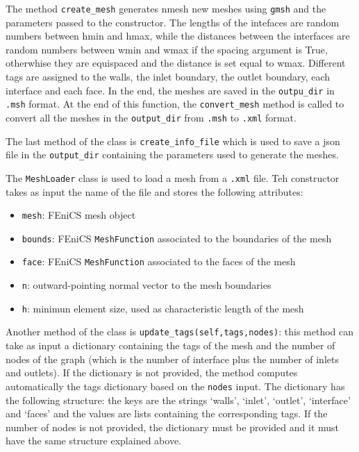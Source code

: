 \documentclass[11pt,a4paper]{article}
\begin{document}
The method \texttt{create\_mesh} generates nmesh new meshes using \texttt{gmsh} and the parameters passed to the constructor. The lengths of the intefaces are random numbers between hmin and hmax, while the distances between the interfaces are random numbers between wmin and wmax if the spacing argument is True, otherwhise they are equispaced and the distance is set equal to wmax. Different tags are assigned to the walls, the inlet boundary, the outlet boundary, each interface and each face. In the end, the meshes are saved in the \texttt{outpu\_dir} in \texttt{.msh} format.
At the end of this function, the \texttt{convert\_mesh} method is called to convert all the meshes in the \texttt{output\_dir} from \texttt{.msh} to \texttt{.xml} format. 

The last method of the class is \texttt{create\_info\_file} which is used to save a json file in the \texttt{output\_dir} containing the parameters used to generate the meshes.

The \texttt{MeshLoader} class is used to load a mesh from a \texttt{.xml} file. Teh constructor takes as input the name of the file and stores the following attributes:
\begin{itemize}
    \item \texttt{mesh}: FEniCS mesh object
    \item \texttt{bounds}: FEniCS \texttt{MeshFunction} associated to the boundaries of the mesh
    \item \texttt{face}: FEniCS \texttt{MeshFunction} associated to the faces of the mesh
    \item \texttt{n}: outward-pointing normal vector to the mesh boundaries
    \item \texttt{h}: minimun element size, used as characteristic length of the mesh
\end{itemize}

Another method of the class is \texttt{update\_tags(self,tags,nodes)}: this method can take as input a dictionary containing the tags of the mesh and the number of nodes of the graph (which is the number of interface plus the number of inlets and outlets). If the dictionary is not provided, the method computes automatically the tags dictionary based on the \texttt{nodes} input. The dictionary has the following structure: the keys are the strings `walls', `inlet', `outlet', `interface' and `faces' and the values are lists containing the corresponding tags. %
If the number of nodes is not provided, the dictionary must be provided and it must have the same structure explained above.
\end{document}
